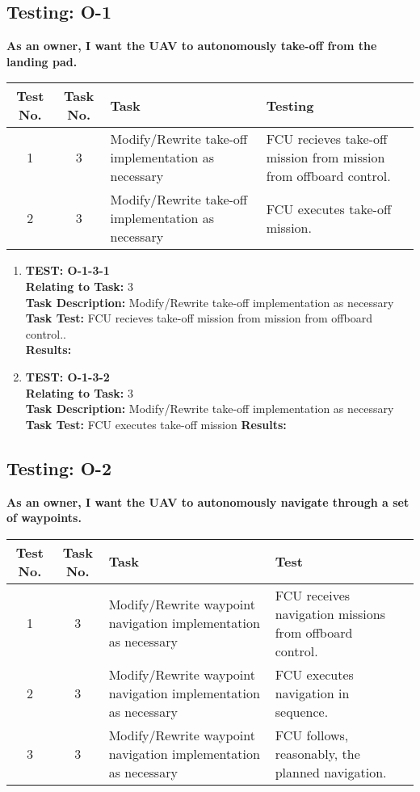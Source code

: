 \subsection{Testing: O-1}
\textbf{As an owner, I want the UAV to autonomously take-off from the landing pad.}\\
\begin{tabular}{| c | c | >{\raggedright}m{4cm} | m{4cm} | c |}\hline
	Test No. & Task No. & Task & Testing\\\hline
	1 & 3 & Modify/Rewrite take-off implementation as necessary
 & FCU recieves take-off mission from mission from offboard control.\\\hline	
	2 & 3 & Modify/Rewrite take-off implementation as necessary
 & FCU executes take-off mission.\\\hline	
\end{tabular}

\begin{enumerate}
\item \textbf{TEST: O-1-3-1}\\
\textbf{Relating to Task:} 3\\
\textbf{Task Description:} Modify/Rewrite take-off implementation as necessary \\
\textbf{Task Test:} FCU recieves take-off mission from mission from offboard control..\\
\textbf{Results:} 

\item \textbf{TEST: O-1-3-2}\\
\textbf{Relating to Task:} 3\\
\textbf{Task Description:} Modify/Rewrite take-off implementation as necessary\\
\textbf{Task Test:} FCU executes take-off mission
\textbf{Results:} 

\end{enumerate}


\subsection{Testing: O-2}
\textbf{As an owner, I want the UAV to autonomously navigate through a set of waypoints.}\\
\begin{tabular}{| c | c | >{\raggedright}m{4cm} | m{4cm} | c |}\hline
	Test No. & Task No. & Task & Test\\\hline
	1 & 3 & Modify/Rewrite waypoint navigation implementation as necessary & FCU receives navigation missions from offboard control.\\\hline
	2 & 3 & Modify/Rewrite waypoint navigation implementation as necessary & FCU executes navigation in sequence.\\\hline
	3 & 3 & Modify/Rewrite waypoint navigation implementation as necessary & FCU follows, reasonably, the planned navigation.\\\hline
\end{tabular}

